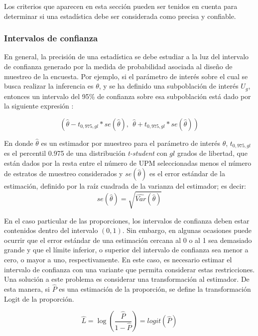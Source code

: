 \documentclass[
  10pt,
  spanish,
]{book}
\begin{document}
Los criterios que aparecen en esta sección pueden ser tenidos en cuenta para determinar si una estadística debe ser considerada como precisa y confiable.

\hypertarget{intervalos-de-confianza}{%
\subsubsection*{Intervalos de confianza}\label{intervalos-de-confianza}}

En general, la precisión de una estadística se debe estudiar a la luz del intervalo de confianza generado por la medida de probabilidad asociada al diseño de muestreo de la encuesta. Por ejemplo, si el parámetro de interés sobre el cual se busca realizar la inferencia es \(\theta\), y se ha definido una subpoblación de interés \(U_g\), entonces un intervalo del 95\% de confianza sobre esa subpoblación está dado por la siguiente expresión \citep{Heeringa_West_Berglund_2010}:

\[
(\hat\theta - t_{0,975, gl} * se(\hat\theta), \ \ \hat\theta + t_{0,975, gl} * se(\hat\theta))
\]

En donde \(\hat\theta\) es un estimador por muestreo para el parámetro de interés \(\theta\), \(t_{0,975, gl}\) es el percentil 0.975 de una distribución \emph{t-student} con \(gl\) grados de libertad, que están dados por la resta entre el número de UPM seleccionadas menos el número de estratos de muestreo considerados y \(se(\hat\theta)\) es el error estándar de la estimación, definido por la raíz cuadrada de la varianza del estimador; es decir:
\[
se(\hat\theta) = \sqrt{\widehat{Var}(\hat\theta)}
\]

En el caso particular de las proporciones, los intervalos de confianza deben estar contenidos dentro del intervalo \((0, 1)\). Sin embargo, en algunas ocasiones puede ocurrir que el error estándar de una estimación cercana al 0 o al 1 sea demasiado grande y que el límite inferior, o superior del intervalo de confianza sea menor a cero, o mayor a uno, respectivamente. En este caso, es necesario estimar el intervalo de confianza con una variante que permita considerar estas restricciones. Una solución a este problema es considerar una transformación al estimador. De esta manera, si \(\hat{P}\) es una estimación de la proporción, se define la transformación Logit de la proporción.

\begin{equation}
\label{L1}
\hat{L} = \log \left(\dfrac{\hat{P}}{1-\hat{P}} \right) = logit(\hat{P})
\end{equation}
\end{document}
